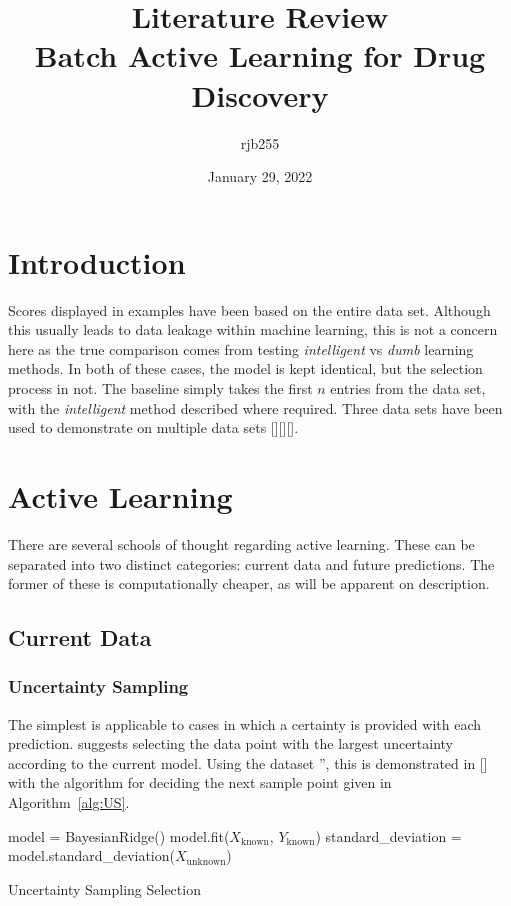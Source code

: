 \documentclass[a4paper, english]{report}
\begin{document}
\title{\Large{\textbf{Literature Review}}\\Batch Active Learning for Drug Discovery}
\author{rjb255}
\date{January 29, 2022}

\maketitle

\begin{abstract}
    \blindtext[1]{}
\end{abstract}

\section{Introduction}
\blindtext[2]{}

Scores displayed in examples have been based on the entire data set. Although this usually leads to data leakage within machine learning, this is not a concern here as the true comparison comes from testing  \textit{intelligent} vs \textit{dumb} learning methods. In both of these cases, the model is kept identical, but the selection process in not. The baseline simply takes the first $n$ entries from the data set, with the \textit{intelligent} method described where required. Three data sets have been used to demonstrate on multiple data sets [][][].

\section{Active Learning}\label{ch:Active Learning}
There are several schools of thought regarding active learning. These can be separated into two distinct categories: current data and future predictions. The former of these is computationally cheaper, as will be apparent on description.

\subsection{Current Data}
\subsubsection{Uncertainty Sampling}\label{sec:Uncertainty Sampling}
The simplest is applicable to cases in which a certainty is provided with each prediction. \textcite{LitRev_2009} suggests selecting the data point with the largest uncertainty according to the current model. Using the dataset '', this is demonstrated in [] with the algorithm for deciding the next sample point given in Algorithm~\ref{alg:US}.
\begin{algorithm}[H]
    \label{alg:US}\SetAlgoLined
    model = BayesianRidge()\;
    model.fit($X_\mathrm{known}$, $Y_\mathrm{known}$)\;
    standard\_deviation = model.standard\_deviation($X_\mathrm{unknown}$)\;
    \caption{Uncertainty Sampling Selection}
\end{algorithm}
\end{document}

